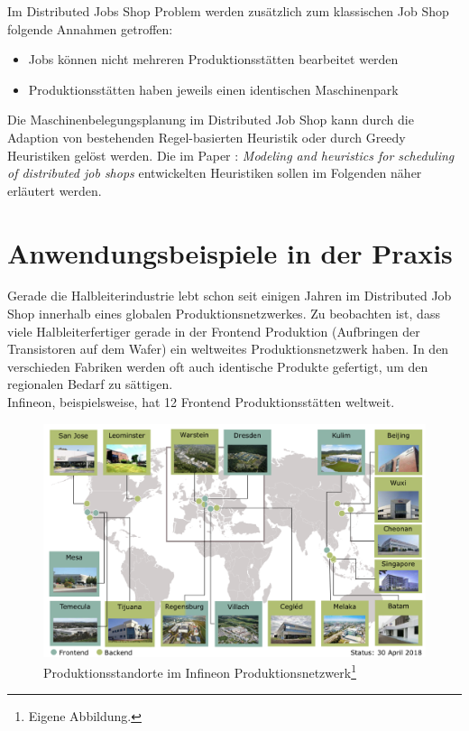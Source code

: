 \documentclass[final, english, ngerman, a4paper, 12pt, %
numbers=noenddot,
cd=true,
cdfont=false,cdfont=nohead,cdfont=nodin,
cdmath=false,
cdhead=false,
cdfoot=true,
cdcover=monochrome,
cdgeometry=symmetric,
declaration=heading,
declaration=notoc,
abstract=heading,
]{tudscrreprt}
\begin{document}
Im Distributed Jobs Shop Problem werden zusätzlich zum klassischen Job Shop folgende Annahmen getroffen:

\begin{itemize}
	\item Jobs können nicht mehreren Produktionsstätten bearbeitet werden
	\item Produktionsstätten haben jeweils einen identischen Maschinenpark
\end{itemize}

Die Maschinenbelegungsplanung im Distributed Job Shop kann durch die Adaption von bestehenden Regel-basierten Heuristik oder durch Greedy Heuristiken gelöst werden. Die im Paper \cite{djs-modeling}: \textit{Modeling and heuristics for scheduling of distributed job shops} entwickelten Heuristiken sollen im Folgenden näher erläutert werden.

\chapter{Anwendungsbeispiele in der Praxis}

Gerade die Halbleiterindustrie lebt schon seit einigen Jahren im Distributed Job Shop innerhalb eines globalen Produktionsnetzwerkes. Zu beobachten ist, dass viele Halbleiterfertiger gerade in der Frontend Produktion (Aufbringen der Transistoren auf dem Wafer) ein weltweites Produktionsnetzwerk haben. In den verschieden Fabriken werden oft auch identische Produkte gefertigt, um den regionalen Bedarf zu sättigen. \\

Infineon, beispielsweise, hat 12 Frontend Produktionsstätten weltweit.
\begin{figure}[h]
	\centering
	\includegraphics[width=\textwidth]{./settings/infineon}
	\caption[Produktionsstandorte im Infineon Produktionsnetzwerk]{Produktionsstandorte im Infineon Produktionsnetzwerk\footnote{Eigene Abbildung.}}\label{fig:ifx}
\end{figure}
\end{document}
